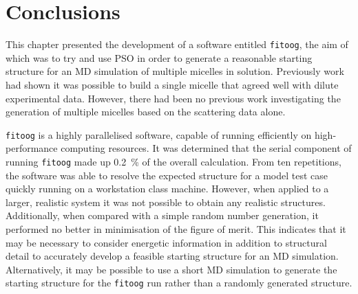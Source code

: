 \section{Conclusions}
This chapter presented the development of a software entitled \texttt{fitoog}, the aim of which was to try and use PSO in order to generate a reasonable starting structure for an MD simulation of multiple micelles in solution.
Previously work had shown it was possible to build a single micelle that agreed well with dilute experimental data.
However, there had been no previous work investigating the generation of multiple micelles based on the scattering data alone.

\texttt{fitoog} is a highly parallelised software, capable of running efficiently on high-performance computing resources.
It was determined that the serial component of running \texttt{fitoog} made up \SI{0.2}{\percent} of the overall calculation.
From ten repetitions, the software was able to resolve the expected structure for a model test case quickly running on a workstation class machine.
However, when applied to a larger, realistic system it was not possible to obtain any realistic structures.
Additionally, when compared with a simple random number generation, it performed no better in minimisation of the figure of merit.
This indicates that it may be necessary to consider energetic information in addition to structural detail to accurately develop a feasible starting structure for an MD simulation.
Alternatively, it may be possible to use a short MD simulation to generate the starting structure for the \texttt{fitoog} run rather than a randomly generated structure.
